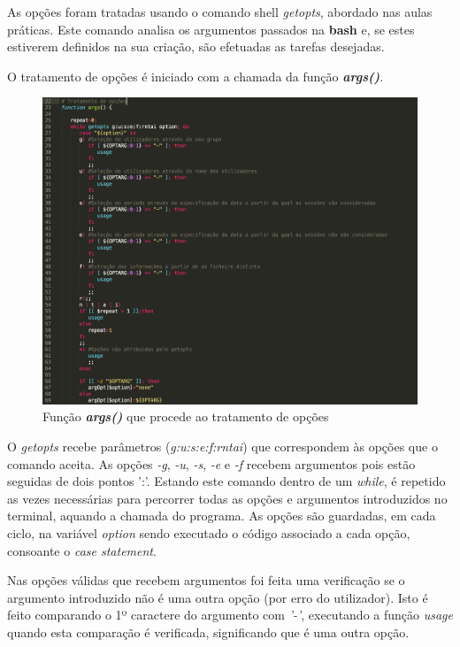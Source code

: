 \documentclass[10pt,portuguese]{article}
\begin{document}
\par As opções foram tratadas usando o comando shell \textit{getopts}, abordado nas aulas práticas. Este comando analisa os argumentos passados na \textbf{bash} e, se estes estiverem definidos na sua criação, são efetuadas as tarefas desejadas.
\newline
\par O tratamento de opções é iniciado com a chamada da função \textbf{\textit{args()}}.
\begin{figure}[!h]
    \centering
    \includegraphics[width=\textwidth]{getopts.png}
    \caption{Função \textbf{\textit{args()}} que procede ao tratamento de opções}
\end{figure}
\par O \textit{getopts} recebe parâmetros (\textit{g:u:s:e:f:rntai}) que correspondem às opções que o comando aceita. As opções \textit{-g}, \textit{-u}, \textit{-s}, \textit{-e} e \textit{-f} recebem argumentos pois estão seguidas de dois pontos ':'. Estando este comando dentro de um \textit{while}, é repetido as vezes necessárias para percorrer todas as opções e argumentos introduzidos no terminal, aquando a chamada do programa. As opções são guardadas, em cada ciclo, na variável \textit{option} sendo executado o código associado a cada opção, consoante o \textit{case statement}.
\par Nas opções válidas que recebem argumentos foi feita uma verificação se o argumento introduzido não é uma outra opção (por erro do utilizador). Isto é feito comparando o 1º caractere do argumento com \textit{'-'}, executando a função \textit{usage} quando esta comparação é verificada, significando que é uma outra opção.
\end{document}
